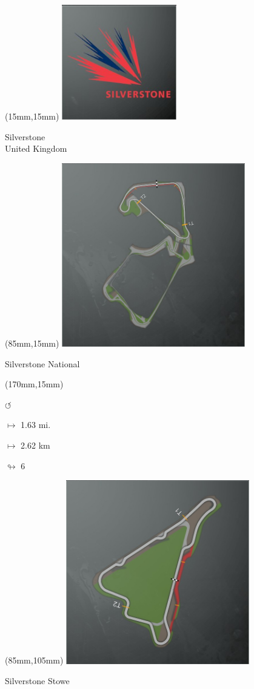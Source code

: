 \begin{textblock*}{60mm}(15mm,15mm)%
\includegraphics[width=50mm]{LG/2015-05-20_00094.png}
\par Silverstone\\ United Kingdom
\end{textblock*}
\begin{textblock*}{80mm}(85mm,15mm)%
\includegraphics[width=80mm]{TR/2015-05-20_00058.png}
\centerline{Silverstone National}
\end{textblock*}
\begin{textblock*}{30mm}(170mm,15mm)%
\par \Huge$\circlearrowleft$
\Large
\par$\mapsto$ 1.63 mi.
\par$\mapsto$ 2.62 km
\par$\looparrowright$ 6
\end{textblock*}
\begin{textblock*}{80mm}(85mm,105mm)%
\includegraphics[width=80mm]{TR/2015-05-20_00059.png}
\centerline{Silverstone Stowe}
\end{textblock*}
